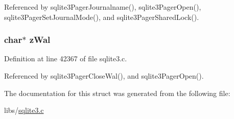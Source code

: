 Referenced by sqlite3\+Pager\+Journalname(), sqlite3\+Pager\+Open(), sqlite3\+Pager\+Set\+Journal\+Mode(), and sqlite3\+Pager\+Shared\+Lock().

\hypertarget{struct_pager_a383f1a3f6524788fe82a0f19e97fbb01}{}
\subsubsection[{z\+Wal}]{\setlength{\rightskip}{0pt plus 5cm}char$\ast$ z\+Wal}\label{struct_pager_a383f1a3f6524788fe82a0f19e97fbb01}


Definition at line 42367 of file sqlite3.\+c.



Referenced by sqlite3\+Pager\+Close\+Wal(), and sqlite3\+Pager\+Open().



The documentation for this struct was generated from the following file\+:\begin{DoxyCompactItemize}
\item 
libs/\hyperlink{sqlite3_8c}{sqlite3.\+c}\end{DoxyCompactItemize}
